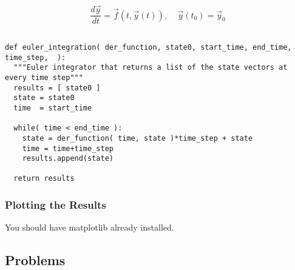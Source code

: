 \begin{displaymath}
\frac{d\vec{y}}{dt}=\vec{f}(t,\vec{y}(t)),\:\:\:\:\: \vec{y}(t_0)=\vec{y}_0
\end{displaymath}

\begin{lstlisting}[caption=Euler Integrator,
  label=harmonicOscillator,
  float=t]

def euler_integration( der_function, state0, start_time, end_time, time_step,  ):
  """Euler integrator that returns a list of the state vectors at every time step"""
  results = [ state0 ]
  state = state0
  time  = start_time

  while( time < end_time ):
    state = der_function( time, state )*time_step + state
    time = time+time_step
    results.append(state)

  return results

\end{lstlisting}

\subsubsection{Plotting the Results}

You should have matplotlib already installed.

\subsection{Problems}
